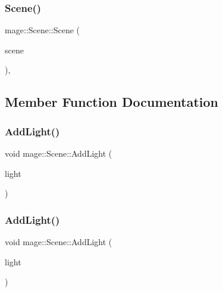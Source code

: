 \hypertarget{classmage_1_1_scene_a35b8fc4242c2348e53014b96416fc3d3}{}\label{classmage_1_1_scene_a35b8fc4242c2348e53014b96416fc3d3} 
\subsubsection{\texorpdfstring{Scene()}{Scene()}\hspace{0.1cm}{\footnotesize\ttfamily [3/3]}}
{\footnotesize\ttfamily mage\+::\+Scene\+::\+Scene (\begin{DoxyParamCaption}\item[{\hyperlink{classmage_1_1_scene}{Scene} \&\&}]{scene }\end{DoxyParamCaption})\hspace{0.3cm}{\ttfamily [protected]}, {\ttfamily [default]}}



\subsection{Member Function Documentation}
\hypertarget{classmage_1_1_scene_a6ce8182afe3c1f39249ec08b62aee317}{}\label{classmage_1_1_scene_a6ce8182afe3c1f39249ec08b62aee317} 
\subsubsection{\texorpdfstring{Add\+Light()}{AddLight()}\hspace{0.1cm}{\footnotesize\ttfamily [1/2]}}
{\footnotesize\ttfamily void mage\+::\+Scene\+::\+Add\+Light (\begin{DoxyParamCaption}\item[{\hyperlink{namespacemage_a1e01ae66713838a7a67d30e44c67703e}{Shared\+Ptr}$<$ \hyperlink{namespacemage_a1724c6e6b6b5ba535cdd967cbbb4a669}{Omni\+Light\+Node} $>$}]{light }\end{DoxyParamCaption})\hspace{0.3cm}{\ttfamily [private]}}

\hypertarget{classmage_1_1_scene_aeeba74ee789d4917ed72b179f16c1222}{}\label{classmage_1_1_scene_aeeba74ee789d4917ed72b179f16c1222} 
\subsubsection{\texorpdfstring{Add\+Light()}{AddLight()}\hspace{0.1cm}{\footnotesize\ttfamily [2/2]}}
{\footnotesize\ttfamily void mage\+::\+Scene\+::\+Add\+Light (\begin{DoxyParamCaption}\item[{\hyperlink{namespacemage_a1e01ae66713838a7a67d30e44c67703e}{Shared\+Ptr}$<$ \hyperlink{namespacemage_aeed5dee4ff6c591eabb0e9114256df4a}{Spot\+Light\+Node} $>$}]{light }\end{DoxyParamCaption})\hspace{0.3cm}{\ttfamily [private]}}

